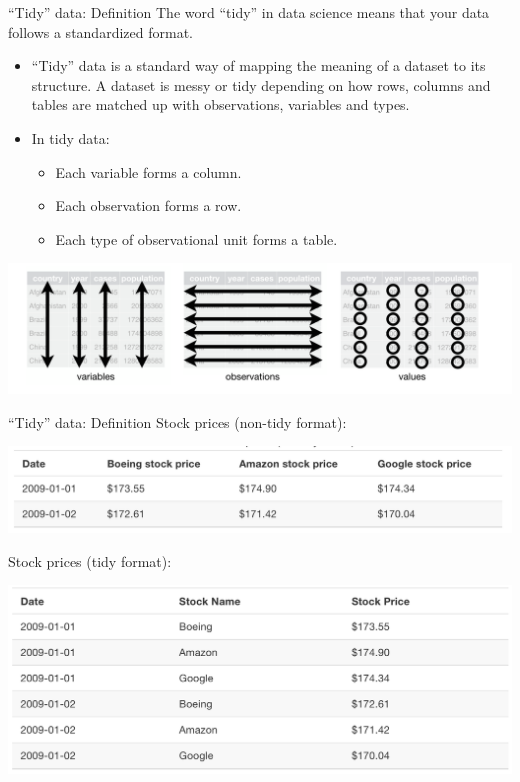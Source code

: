 \documentclass[
  ignorenonframetext,
]{beamer}
\providecommand{\tightlist}{%
  \setlength{\itemsep}{0pt}\setlength{\parskip}{0pt}}
\begin{document}
\begin{frame}{``Tidy'' data: Definition}
\protect\hypertarget{tidy-data-definition}{}
The word ``tidy'' in data science means that your data follows a
standardized format.

\begin{itemize}
\item
  ``Tidy'' data is a standard way of mapping the meaning of a dataset to
  its structure. A dataset is messy or tidy depending on how rows,
  columns and tables are matched up with observations, variables and
  types.
\item
  In tidy data:

  \begin{itemize}
  \tightlist
  \item
    Each variable forms a column.
  \item
    Each observation forms a row.
  \item
    Each type of observational unit forms a table.
  \end{itemize}
\end{itemize}

\small

\begin{center}\includegraphics[width=0.6\linewidth,height=0.25\textheight]{week3new2} \end{center}
\normalsize
\end{frame}

\begin{frame}{``Tidy'' data: Definition}
\protect\hypertarget{tidy-data-definition-1}{}
Stock prices (non-tidy format): \small

\begin{center}\includegraphics[width=0.7\linewidth,height=0.25\textheight]{week3new3} \end{center}
\normalsize

Stock prices (tidy format):

\small

\begin{center}\includegraphics[width=0.6\linewidth,height=0.4\textheight]{week3new4} \end{center}
\normalsize
\end{frame}
\end{document}
